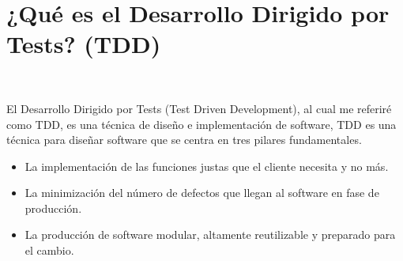 \section{¿Qué es el Desarrollo Dirigido por Tests? (TDD)} 
\textbf{}\\
\begin{flushleft}
El Desarrollo Dirigido por Tests (Test Driven Development), al cual me referiré como TDD, es una técnica de diseño e implementación de software,
TDD es una técnica para diseñar software que se centra en tres pilares fundamentales.

\begin{itemize}


\item  La implementación de las funciones justas que el cliente necesita y no más.

\item  La minimización del número de defectos que llegan al software en fase de producción.

\item La producción de software modular, altamente reutilizable y preparado para el cambio.


	


\end{itemize} 


\end{flushleft}